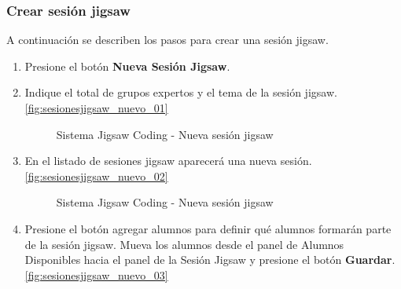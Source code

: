 \subsubsection{Crear sesión jigsaw}
A continuación se describen los pasos para crear una sesión jigsaw.
\begin{enumerate}
	\item Presione el botón \textbf{Nueva Sesión Jigsaw}.
	\item Indique el total de grupos expertos y el tema de la sesión jigsaw. \autoref{fig:sesionesjigsaw_nuevo_01}
	\begin{figure}[h!]
	\centering
	\caption[SJC Sesiones jigsaw]{Sistema Jigsaw Coding - Nueva sesión jigsaw}
	\label{fig:sesionesjigsaw_nuevo_01}
	\end{figure}
	\item En el listado de sesiones jigsaw aparecerá una nueva sesión.\autoref{fig:sesionesjigsaw_nuevo_02}
	\begin{figure}[h!]
	\centering
	\caption{Sistema Jigsaw Coding - Nueva sesión jigsaw}
	\label{fig:sesionesjigsaw_nuevo_02}
	\end{figure}
	\item Presione el botón agregar alumnos para definir qué alumnos formarán parte de la sesión jigsaw. Mueva los alumnos desde el panel de Alumnos Disponibles hacia el panel de la Sesión Jigsaw y presione el botón \textbf{Guardar}.  \autoref{fig:sesionesjigsaw_nuevo_03}
	\begin{figure}[h!]

\end{figure}
\end{enumerate}
